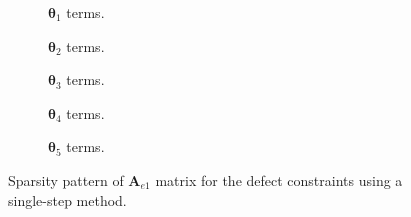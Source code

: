 \begin{figure}[ht]

\centering

\begin{subfigure}{0.33\textwidth}
\centering
\begin{minipage}{\textwidth}

\end{minipage}
\caption{$\bm{\theta}_1$ terms.}
\end{subfigure}%
\begin{subfigure}{0.33\textwidth}
\centering
\begin{minipage}{\textwidth}

\end{minipage}
\caption{$\bm{\theta}_2$ terms.}
\end{subfigure}%
\begin{subfigure}{0.33\textwidth}
\centering
\begin{minipage}{\textwidth}

\end{minipage}
\caption{$\bm{\theta}_3$ terms.}
\end{subfigure}%

\begin{subfigure}{0.33\textwidth}
\centering
\begin{minipage}{\textwidth}

\end{minipage}
\caption{$\bm{\theta}_4$ terms.}
\end{subfigure}%
\begin{subfigure}{0.33\textwidth}
\centering
\begin{minipage}{\textwidth}

\end{minipage}
\caption{$\bm{\theta}_5$ terms.}
\end{subfigure}%

\caption{Sparsity pattern of $\mathbf{A}_{e1}$ matrix for the defect constraints using a single-step method.}\label{fig:figsparsityASS}
\end{figure}




% 	
% 	
% 	

